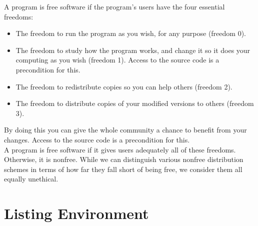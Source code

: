 \documentclass[6pt,a4paper]{report}
\begin{document}
	A program is free software if the program's users have the four essential freedoms:	\\
	\begin{itemize}
		\item The freedom to run the program as you wish, for any purpose (freedom 0).
		\item The freedom to study how the program works, and change it so it does your computing as you wish (freedom 1). Access to the source code is a precondition for this.
		\item The freedom to redistribute copies so you can help others (freedom 2).
		\item The freedom to distribute copies of your modified versions to others (freedom 3). 
		
	\end{itemize}
	
	
	By doing this you can give the whole community a chance to benefit from your changes. Access to the source code is a precondition for this. \\
	
	A program is free software if it gives users adequately all of these freedoms. Otherwise, it is nonfree. While we can distinguish various nonfree distribution schemes in terms of how far they fall short of being free, we consider them all equally unethical.
	
	
	\chapter{Listing Environment}
	
\end{document}
